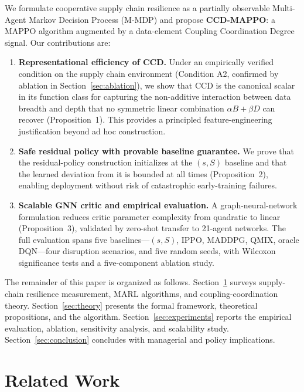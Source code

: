 \documentclass[11pt,a4paper]{article}
\theoremstyle{plain}
\theoremstyle{definition}
\begin{document}
We formulate cooperative supply chain resilience as a partially observable Multi-Agent
Markov Decision Process (M-MDP) and propose \textbf{CCD-MAPPO}: a MAPPO algorithm
augmented by a data-element Coupling Coordination Degree signal.  Our contributions are:

\begin{enumerate}[label=\textbf{C\arabic*.},leftmargin=*]
\item \textbf{Representational efficiency of CCD.}  Under an empirically verified
  condition on the supply chain environment (Condition A2, confirmed by ablation in
  Section~\ref{sec:ablation}), we show that CCD is the canonical scalar in its
  function class for capturing the non-additive interaction between data breadth
  and depth that no symmetric linear combination $\alpha B+\beta D$ can recover
  (Proposition~1).
  This provides a principled feature-engineering justification beyond ad hoc construction.

\item \textbf{Safe residual policy with provable baseline guarantee.}  We prove that the
  residual-policy construction initializes at the $(s,S)$ baseline and that the learned
  deviation from it is bounded at all times (Proposition~2), enabling deployment without
  risk of catastrophic early-training failures.

\item \textbf{Scalable GNN critic and empirical evaluation.}  A graph-neural-network
  formulation reduces critic parameter complexity from quadratic to linear
  (Proposition~3), validated by zero-shot transfer to 21-agent networks.  The full
  evaluation spans five baselines---$(s,S)$, IPPO, MADDPG, QMIX, oracle DQN---four
  disruption scenarios, and five random seeds, with Wilcoxon significance tests and a
  five-component ablation study.
\end{enumerate}

The remainder of this paper is organized as follows.
Section~\ref{sec:related} surveys supply-chain resilience measurement, MARL algorithms,
and coupling-coordination theory.
Section~\ref{sec:theory} presents the formal framework, theoretical propositions, and the
algorithm.
Section~\ref{sec:experiments} reports the empirical evaluation, ablation, sensitivity
analysis, and scalability study.
Section~\ref{sec:conclusion} concludes with managerial and policy implications.

\section{Related Work}
\label{sec:related}
\end{document}
